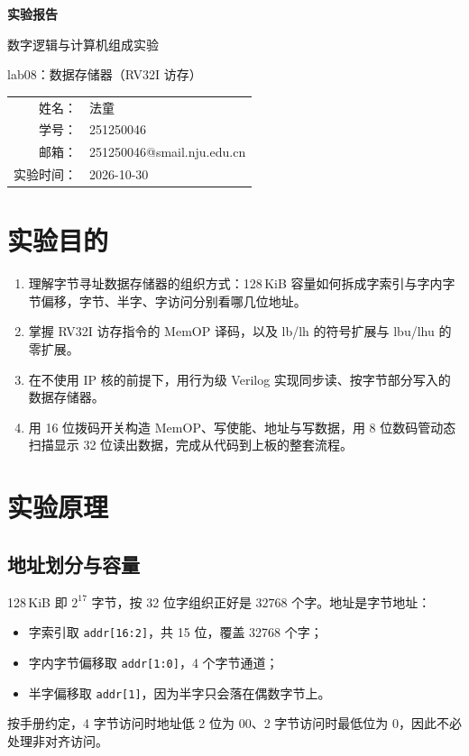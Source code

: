 \documentclass[12pt, a4paper]{ctexart}
\makeatletter
\newcommand{\coursename}{数字逻辑与计算机组成实验}
\newcommand{\expname}{lab08：数据存储器（RV32I 访存）}
\newcommand{\expdate}{2026-10-30}
\newcommand{\stuname}{法童}
\newcommand{\stuid}{251250046}
\newcommand{\stumail}{251250046@smail.nju.edu.cn}
\makeatother
\begin{document}
\begin{titlepage}
    \centering
    \vspace*{4cm}
    {\Huge\bfseries 实验报告\par}
    \vspace{1.5cm}
    {\Large \coursename\par}
    \vspace{0.8cm}
    {\Large \expname\par}
    \vspace{3cm}
    {\large
    \begin{tabular}{rl}
        姓名： & \stuname \\
        学号： & \stuid \\
        邮箱： & \stumail \\
        实验时间： & \expdate \\
    \end{tabular}\par}
\end{titlepage}

\section{实验目的}
\begin{enumerate}
    \item 理解字节寻址数据存储器的组织方式：128\,KiB 容量如何拆成字索引与字内字节偏移，字节、半字、字访问分别看哪几位地址。
    \item 掌握 RV32I 访存指令的 MemOP 译码，以及 lb/lh 的符号扩展与 lbu/lhu 的零扩展。
    \item 在不使用 IP 核的前提下，用行为级 Verilog 实现同步读、按字节部分写入的数据存储器。
    \item 用 16 位拨码开关构造 MemOP、写使能、地址与写数据，用 8 位数码管动态扫描显示 32 位读出数据，完成从代码到上板的整套流程。
\end{enumerate}

\section{实验原理}

\subsection{地址划分与容量}
128\,KiB 即 $2^{17}$ 字节，按 32 位字组织正好是 $32768$ 个字。地址是字节地址：
\begin{itemize}
    \item 字索引取 \texttt{addr[16:2]}，共 15 位，覆盖 32768 个字；
    \item 字内字节偏移取 \texttt{addr[1:0]}，4 个字节通道；
    \item 半字偏移取 \texttt{addr[1]}，因为半字只会落在偶数字节上。
\end{itemize}
按手册约定，4 字节访问时地址低 2 位为 00、2 字节访问时最低位为 0，因此不必处理非对齐访问。
\end{document}

